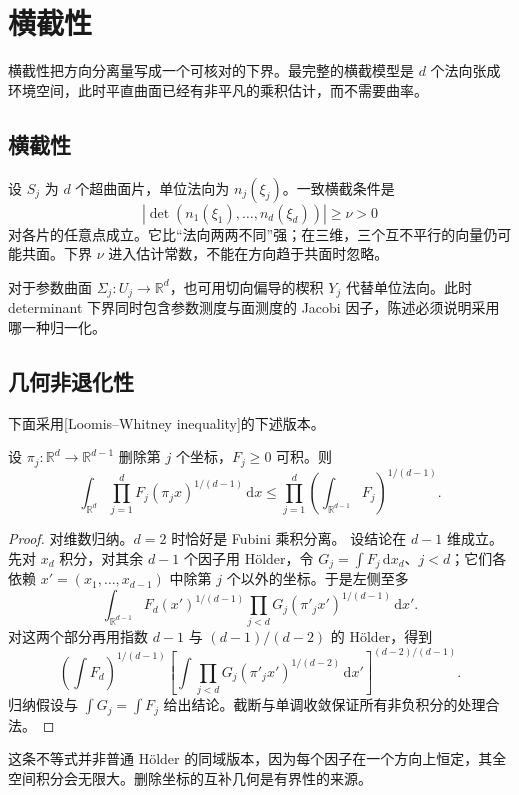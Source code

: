 \section{横截性}
\label{b2:sec:2502}

横截性把方向分离量写成一个可核对的下界。最完整的横截模型是 \(d\) 个法向张成环境空间，此时平直曲面已经有非平凡的乘积估计，而不需要曲率。

\subsection{横截性}
\label{b2:subsec:250201}

设 \(S_j\) 为 \(d\) 个超曲面片，单位法向为 \(n_j(\xi_j)\)。一致横截条件是
\[
 |\det(n_1(\xi_1),\ldots,n_d(\xi_d))|\ge\nu>0
\]
对各片的任意点成立。它比“法向两两不同”强；在三维，三个互不平行的向量仍可能共面。下界 \(\nu\) 进入估计常数，不能在方向趋于共面时忽略。

\ProseParagraphBreak
对于参数曲面 \(\Sigma_j:U_j\to\mathbb R^d\)，也可用切向偏导的楔积 \(Y_j\) 代替单位法向。此时 determinant 下界同时包含参数测度与面测度的 Jacobi 因子，陈述必须说明采用哪一种归一化。

\subsection{几何非退化性}
\label{b2:subsec:250202}

下面采用[Loomis--Whitney inequality]的下述版本。

\begin{theorem}\label{b2:thm:25-loomis-whitney}
设 \(\pi_j:\mathbb R^d\to\mathbb R^{d-1}\) 删除第 \(j\) 个坐标，\(F_j\ge0\) 可积。则
\[
 \int_{\mathbb R^d}\prod_{j=1}^dF_j(\pi_jx)^{1/(d-1)}\,\mathrm dx
 \le\prod_{j=1}^d\left(\int_{\mathbb R^{d-1}}F_j\right)^{1/(d-1)}.
\]
\end{theorem}
\begin{proof}
对维数归纳。\(d=2\) 时恰好是 Fubini 乘积分离。
设结论在 \(d-1\) 维成立。先对 \(x_d\) 积分，对其余 \(d-1\) 个因子用 Hölder，令
\(G_j=\int F_j\,\mathrm dx_d\)、\(j<d\)；它们各依赖 \(x'=(x_1,\ldots,x_{d-1})\) 中除第 \(j\) 个以外的坐标。于是左侧至多
\[
 \int_{\mathbb R^{d-1}}F_d(x')^{1/(d-1)}
                     \prod_{j<d}G_j(\pi'_jx')^{1/(d-1)}\,\mathrm dx'.
\]
对这两个部分再用指数 \(d-1\) 与 \((d-1)/(d-2)\) 的 Hölder，得到
\[
 \left(\int F_d\right)^{1/(d-1)}
 \left[\int\prod_{j<d}G_j(\pi'_jx')^{1/(d-2)}\,\mathrm dx'\right]^{(d-2)/(d-1)}.
\]
归纳假设与 \(\int G_j=\int F_j\) 给出结论。截断与单调收敛保证所有非负积分的处理合法。
\end{proof}
这条不等式并非普通 Hölder 的同域版本，因为每个因子在一个方向上恒定，其全空间积分会无限大。删除坐标的互补几何是有界性的来源。


